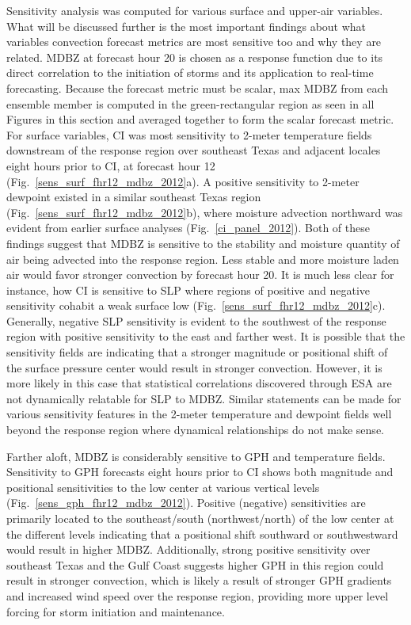 \documentclass{ttuthes2007}
\newcommand{\tab}{\hspace*{2em}}  %
\begin{document}
\tab Sensitivity analysis was computed for various surface and upper-air variables. What will be discussed further is the most important findings about what variables convection forecast metrics are most sensitive too and why they are related. MDBZ at forecast hour 20 is chosen as a response function due to its direct correlation to the initiation of storms and its application to real-time forecasting. Because the forecast metric must be scalar, max MDBZ from each ensemble member is computed in the green-rectangular region as seen in all Figures in this section and averaged together to form the scalar forecast metric. For surface variables, CI was most sensitivity to 2-meter temperature fields downstream of the response region over southeast Texas and adjacent locales eight hours prior to CI, at forecast hour 12 (Fig.~\ref{sens_surf_fhr12_mdbz_2012}a). A positive sensitivity to 2-meter dewpoint existed in a similar southeast Texas region (Fig.~\ref{sens_surf_fhr12_mdbz_2012}b), where moisture advection northward was evident from earlier surface analyses (Fig.~\ref{ci_panel_2012}). Both of these findings suggest that MDBZ is sensitive to the stability and moisture quantity of air being advected into the response region. Less stable and more moisture laden air would favor stronger convection by forecast hour 20.  It is much less clear for instance, how CI is sensitive to SLP where regions of positive and negative sensitivity cohabit a weak surface low (Fig.~\ref{sens_surf_fhr12_mdbz_2012}c). Generally, negative SLP sensitivity is evident to the southwest of the response region with positive sensitivity to the east and farther west. It is possible that the sensitivity fields are indicating that a stronger magnitude or positional shift of the surface pressure center would result in stronger convection. However, it is more likely in this case that statistical correlations discovered through ESA are not dynamically relatable for SLP to MDBZ. Similar statements can be made for various sensitivity features in the 2-meter temperature and dewpoint fields well beyond the response region where dynamical relationships do not make sense.

\tab Farther aloft, MDBZ is considerably sensitive to GPH and temperature fields. Sensitivity to GPH forecasts eight hours prior to CI shows both magnitude and positional sensitivities to the low center at various vertical levels (Fig.~\ref{sens_gph_fhr12_mdbz_2012}). Positive (negative) sensitivities are primarily located to the southeast/south (northwest/north) of the low center at the different levels indicating that a positional shift southward or southwestward would result in higher MDBZ. Additionally, strong positive sensitivity over southeast Texas and the Gulf Coast suggests higher GPH in this region could result in stronger convection, which is likely a result of stronger GPH gradients and increased wind speed over the response region, providing more upper level forcing for storm initiation and maintenance.
\end{document}
